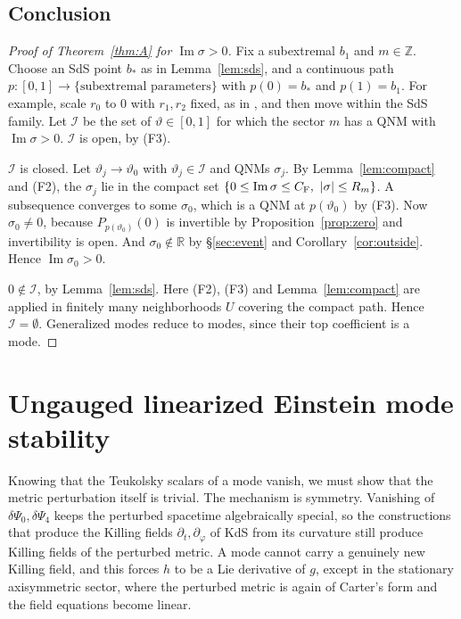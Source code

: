\documentclass[11pt]{amsart}
\theoremstyle{definition}
\theoremstyle{remark}
\numberwithin{equation}{section}
\newcommand{\R}{\mathbb{R}}
\newcommand{\Z}{\mathbb{Z}}
\renewcommand{\Im}{\operatorname{Im}}
\begin{document}
\subsection{Conclusion}
\begin{proof}[Proof of Theorem~\ref{thm:A} for $\Im\sigma>0$]
Fix a subextremal $b_1$ and $m\in\Z$. Choose an SdS point $b_*$ as in Lemma~\ref{lem:sds}, and a continuous path
$p:[0,1]\to\{\text{subextremal parameters}\}$ with $p(0)=b_*$ and $p(1)=b_1$. For example, scale $r_0$ to $0$ with
$r_1,r_2$ fixed, as in \cite[\S6]{Hin26}, and then move within the SdS family. Let $\mathcal I$ be the set of $\vartheta\in[0,1]$ for
which the sector $m$ has a QNM with $\Im\sigma>0$.
$\mathcal I$ is open, by (F3).

$\mathcal I$ is closed. Let $\vartheta_j\to \vartheta_0$ with $\vartheta_j\in \mathcal I$ and QNMs $\sigma_j$. By Lemma~\ref{lem:compact} and (F2), the
$\sigma_j$ lie in the compact set $\{0\le\Im\sigma\le C_{\rm F},\ |\sigma|\le R_m\}$. A subsequence converges to some
$\sigma_0$, which is a QNM at $p(\vartheta_0)$ by (F3). Now $\sigma_0\ne0$, because $P_{p(\vartheta_0)}(0)$ is invertible by
Proposition~\ref{prop:zero} and invertibility is open. And $\sigma_0\notin\R$ by \S\ref{sec:event} and
Corollary~\ref{cor:outside}. Hence $\Im\sigma_0>0$.

$0\notin \mathcal I$, by Lemma~\ref{lem:sds}.
Here (F2), (F3) and Lemma~\ref{lem:compact} are applied in finitely many neighborhoods $U$ covering the compact path. Hence $\mathcal I=\emptyset$. Generalized modes reduce to modes, since their top coefficient is a mode.
\end{proof}

\section{Ungauged linearized Einstein mode stability}\label{sec:B}
Knowing that the Teukolsky scalars of a mode vanish, we must show that the metric perturbation itself is trivial. The
mechanism is symmetry. Vanishing of $\delta\Psi_0,\delta\Psi_4$ keeps the perturbed spacetime algebraically special, so
the constructions that produce the Killing fields $\partial_t,\partial_\varphi$ of KdS from its curvature still produce
Killing fields of the perturbed metric. A mode cannot carry a genuinely new Killing field, and this forces $h$ to be
a Lie derivative of $g$, except in the stationary axisymmetric sector, where the perturbed metric is again of Carter's
form and the field equations become linear.
\end{document}
